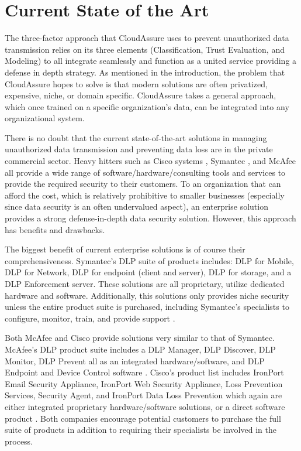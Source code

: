 \section{Current State of the Art}
The three-factor approach that CloudAssure uses to prevent unauthorized data
transmission relies on its three elements (Classification, Trust Evaluation, and
Modeling) to all integrate seamlessly and function as a united service providing
a defense in depth strategy. As mentioned in the introduction, the problem that
CloudAssure hopes to solve is that modern solutions are often privatized,
expensive, niche, or domain specific. CloudAssure takes a general approach,
which once trained on a specific organization's data, can be integrated into any
organizational system.  

There is no doubt that the current state-of-the-art
solutions in managing unauthorized data transmission and preventing data loss
are in the private commercial sector. Heavy hitters such as Cisco systems \autocite{Cisco2008},
Symantec \autocite{Symantec2013}, and McAfee \autocite{McAfee2013} all provide a wide range of
software/hardware/consulting tools and services to provide the required security
to their customers. To an organization that can afford the cost, which is
relatively prohibitive to smaller businesses (especially since data security is
an often undervalued aspect), an enterprise solution provides a strong
defense-in-depth data security solution. However, this approach has benefits and
drawbacks.  

The biggest benefit of current enterprise solutions is of
course their comprehensiveness. Symantec's \gls{DLP} suite of
products includes: \gls{DLP} for Mobile, \gls{DLP} for Network, \gls{DLP} for endpoint (client and
server), \gls{DLP} for storage, and a \gls{DLP} Enforcement server. These solutions are all
proprietary, utilize dedicated hardware and software. Additionally, this
solutions only provides niche
security unless the entire product suite is purchased, including Symantec's
specialists to configure, monitor, train, and provide support \autocite{Symantec2013}.

Both McAfee and Cisco provide solutions very similar to that of Symantec. McAfee's
\gls{DLP} product suite includes a \gls{DLP} Manager, \gls{DLP} Discover,
\gls{DLP} Monitor, \gls{DLP}
Prevent all as an integrated hardware/software, and \gls{DLP} Endpoint and Device Control
software \autocite{McAfee2013}. Cisco's product list includes IronPort Email Security Appliance,
IronPort Web Security Appliance, Loss Prevention Services, Security Agent, and
IronPort Data Loss Prevention which again are either integrated proprietary
hardware/software solutions, or a direct software product \autocite{Cisco2008}. Both companies
encourage potential customers to purchase the full suite of products in addition
to requiring their specialists be involved in the process.  

